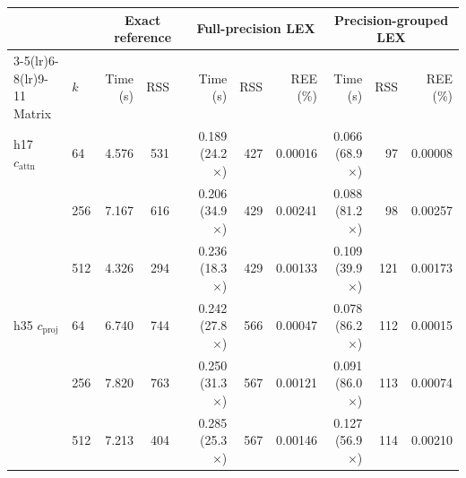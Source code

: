 \setlength{\tabcolsep}{3.5pt}
\begin{tabular}{@{}ll rrr rrr rrr@{}}
\toprule
 &  & \multicolumn{3}{c}{Exact reference} & \multicolumn{3}{c}{Full-precision LEX} & \multicolumn{3}{c}{Precision-grouped LEX} \\
\cmidrule(lr){3-5}\cmidrule(lr){6-8}\cmidrule(lr){9-11}
Matrix & $k$ & Time (s) & RSS &  & Time (s) & RSS & REE (\%) & Time (s) & RSS & REE (\%) \\
\midrule
h17 $c_{\mathrm{attn}}$ & 64 & 4.576 & 531 &  & 0.189 (24.2$\times$) & 427 & 0.00016 & 0.066 (68.9$\times$) & 97 & 0.00008 \\
 & 256 & 7.167 & 616 &  & 0.206 (34.9$\times$) & 429 & 0.00241 & 0.088 (81.2$\times$) & 98 & 0.00257 \\
 & 512 & 4.326 & 294 &  & 0.236 (18.3$\times$) & 429 & 0.00133 & 0.109 (39.9$\times$) & 121 & 0.00173 \\
\addlinespace
h35 $c_{\mathrm{proj}}$ & 64 & 6.740 & 744 &  & 0.242 (27.8$\times$) & 566 & 0.00047 & 0.078 (86.2$\times$) & 112 & 0.00015 \\
 & 256 & 7.820 & 763 &  & 0.250 (31.3$\times$) & 567 & 0.00121 & 0.091 (86.0$\times$) & 113 & 0.00074 \\
 & 512 & 7.213 & 404 &  & 0.285 (25.3$\times$) & 567 & 0.00146 & 0.127 (56.9$\times$) & 114 & 0.00210 \\
\bottomrule
\end{tabular}
